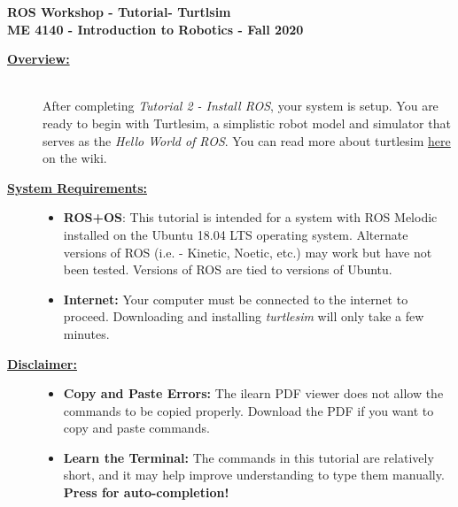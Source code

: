 \documentclass[12pt]{article}
\newcommand{\MNUM}{3} %
\begin{document}
\thispagestyle{plain}

\begin{center}
   {\bf \Large ROS Workshop - Tutorial\hspc\MNUM\hspc - Turtlsim}\vspace{3mm}\\
   {\bf \large ME 4140 - Introduction to Robotics - Fall 2020} \vspace{5mm}\\
\end{center}

\begin{description}

\item[\textbf{\underline{Overview:}}] \hfill \vspace{3mm}\\
After completing {\it Tutorial 2 - Install ROS}, your system is setup. You are ready to begin with Turtlesim, a simplistic robot model and simulator that serves as the {\it Hello World of ROS}. You can read more about turtlesim \href{http://wiki.ros.org/turtlesim}{here} on the wiki. 

\item[\textbf{\underline{System Requirements:}}] \hfill \vspace{0mm}

\begin{itemize}
	\item {\bf ROS+OS}: This tutorial is intended for a system with ROS Melodic installed on the Ubuntu 18.04 LTS operating system. Alternate versions of ROS (i.e. - Kinetic, Noetic, etc.) may work but have not been tested. Versions of ROS are tied to versions of Ubuntu.
	\item {\bf Internet:} Your computer must be connected to the internet to proceed. Downloading and installing {\it turtlesim} will only take a few minutes.
\end{itemize}

\item[\textbf{\underline{Disclaimer:}}] \hfill \vspace{0mm}

\begin{itemize}
	\item {\bf\R Copy and Paste Errors:} {\R The ilearn PDF viewer does not allow the commands to be copied properly. Download the PDF if you want to copy and paste commands.} 
	
	\item {\bf Learn the Terminal:} The commands in this tutorial are relatively short, and it may help improve understanding to type them manually. {\bf Press \TABKey for auto-completion!}
	

\end{itemize}
\end{description}
\end{document}
